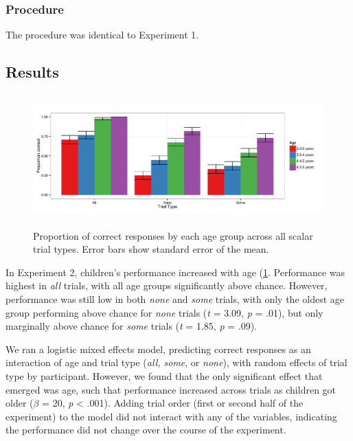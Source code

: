 \documentclass[man]{apa2}
\begin{document}
\subsubsection{Procedure}
The procedure was identical to Experiment 1. 

\subsection{Results}

\begin{figure} 
 \begin{center} 
  \includegraphics[height=2in]{figures/exp2_performance.pdf} 
  \caption{\label{fig:exp2_perf} Proportion of correct responses by each age group across all scalar trial types. Error bars show standard error of the mean.} 
 \end{center} 
\end{figure}

In Experiment 2, children's performance increased with age (\ref{fig:exp2_perf}. Performance was highest in \textit{all} trials, with all age groups significantly above chance. However, performance was still low in both \textit{none} and \textit{some} trials, with only the oldest age group performing above chance for \textit{none} trials (\textit{t} = 3.09, \textit{p} = .01), but only marginally above chance for \textit{some} trials (\textit{t} = 1.85, \textit{p} = .09). 

We ran a logistic mixed effects model, predicting correct responses as an interaction of age and trial type (\textit{all, some}, or \textit{none}), with random effects of trial type by participant. However, we found that the only significant effect that emerged was age, such that performance increased across trials as children got older ($\beta$ = 20, \textit{p} < .001). Adding trial order (first or second half of the experiment) to the model did not interact with any of the variables, indicating the performance did not change over the course of the experiment. 
\end{document}
